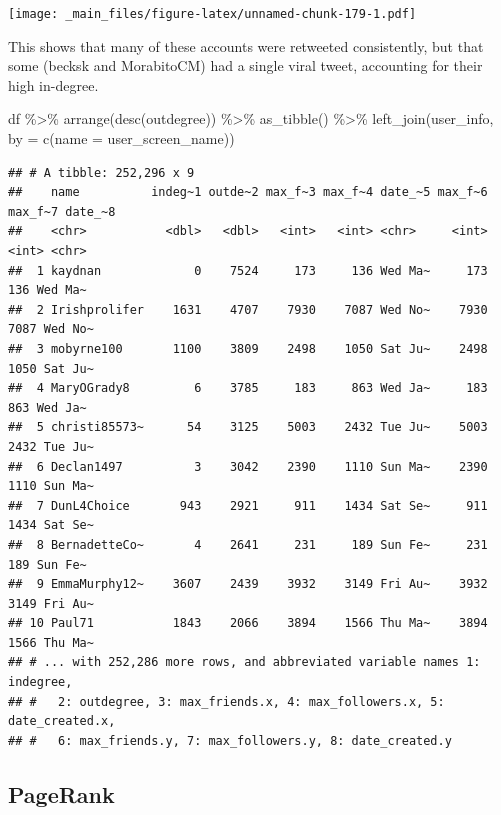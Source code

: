 \documentclass[
]{book}
\newenvironment{Shaded}{\begin{snugshade}}{\end{snugshade}}
\newcommand{\AttributeTok}[1]{\textcolor[rgb]{0.77,0.63,0.00}{#1}}
\newcommand{\FunctionTok}[1]{\textcolor[rgb]{0.00,0.00,0.00}{#1}}
\newcommand{\NormalTok}[1]{#1}
\newcommand{\OtherTok}[1]{\textcolor[rgb]{0.56,0.35,0.01}{#1}}
\newcommand{\SpecialCharTok}[1]{\textcolor[rgb]{0.00,0.00,0.00}{#1}}
\newcommand{\StringTok}[1]{\textcolor[rgb]{0.31,0.60,0.02}{#1}}
\begin{document}
\texttt{[image: \_main\_files/figure-latex/unnamed-chunk-179-1.pdf]}

This shows that many of these accounts were retweeted consistently, but that some (becksk and MorabitoCM) had a single viral tweet, accounting for their high in-degree.

\begin{Shaded}
\begin{Highlighting}[]
\NormalTok{df }\SpecialCharTok{\%\textgreater{}\%} \FunctionTok{arrange}\NormalTok{(}\FunctionTok{desc}\NormalTok{(outdegree)) }\SpecialCharTok{\%\textgreater{}\%} \FunctionTok{as\_tibble}\NormalTok{() }\SpecialCharTok{\%\textgreater{}\%}
  \FunctionTok{left\_join}\NormalTok{(user\_info, }\AttributeTok{by =} \FunctionTok{c}\NormalTok{(}\StringTok{\textquotesingle{}name\textquotesingle{}} \OtherTok{=} \StringTok{\textquotesingle{}user\_screen\_name\textquotesingle{}}\NormalTok{))}
\end{Highlighting}
\end{Shaded}

\begin{verbatim}
## # A tibble: 252,296 x 9
##    name          indeg~1 outde~2 max_f~3 max_f~4 date_~5 max_f~6 max_f~7 date_~8
##    <chr>           <dbl>   <dbl>   <int>   <int> <chr>     <int>   <int> <chr>  
##  1 kaydnan             0    7524     173     136 Wed Ma~     173     136 Wed Ma~
##  2 Irishprolifer    1631    4707    7930    7087 Wed No~    7930    7087 Wed No~
##  3 mobyrne100       1100    3809    2498    1050 Sat Ju~    2498    1050 Sat Ju~
##  4 MaryOGrady8         6    3785     183     863 Wed Ja~     183     863 Wed Ja~
##  5 christi85573~      54    3125    5003    2432 Tue Ju~    5003    2432 Tue Ju~
##  6 Declan1497          3    3042    2390    1110 Sun Ma~    2390    1110 Sun Ma~
##  7 DunL4Choice       943    2921     911    1434 Sat Se~     911    1434 Sat Se~
##  8 BernadetteCo~       4    2641     231     189 Sun Fe~     231     189 Sun Fe~
##  9 EmmaMurphy12~    3607    2439    3932    3149 Fri Au~    3932    3149 Fri Au~
## 10 Paul71           1843    2066    3894    1566 Thu Ma~    3894    1566 Thu Ma~
## # ... with 252,286 more rows, and abbreviated variable names 1: indegree,
## #   2: outdegree, 3: max_friends.x, 4: max_followers.x, 5: date_created.x,
## #   6: max_friends.y, 7: max_followers.y, 8: date_created.y
\end{verbatim}

\hypertarget{pagerank}{%
\subsection{PageRank}\label{pagerank}}
\end{document}
